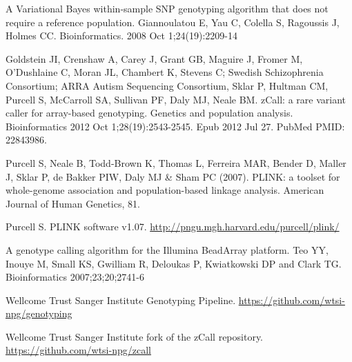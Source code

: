 \documentclass{article}
\begin{document}
\FloatBarrier

\begin{thebibliography}{9}

 A Variational Bayes within-sample SNP genotyping algorithm that does not require a reference population. Giannoulatou E, Yau C, Colella S, Ragoussis J, Holmes CC. Bioinformatics. 2008 Oct 1;24(19):2209-14

Goldstein JI, Crenshaw A, Carey J, Grant GB, Maguire J, Fromer M, O'Dushlaine C, Moran JL, Chambert K, Stevens C; Swedish Schizophrenia Consortium; ARRA Autism Sequencing Consortium, Sklar P, Hultman CM, Purcell S, McCarroll SA, Sullivan PF, Daly MJ, Neale BM. 
zCall: a rare variant caller for array-based genotyping.
Genetics and population analysis. Bioinformatics 2012 Oct 1;28(19):2543-2545. Epub 2012 Jul 27. PubMed PMID: 22843986.

Purcell S, Neale B, Todd-Brown K, Thomas L, Ferreira MAR, Bender D, Maller J, Sklar P, de Bakker PIW, Daly MJ \& Sham PC (2007).
PLINK: a toolset for whole-genome association and population-based linkage analysis. American Journal of Human Genetics, 81.

Purcell S. PLINK software v1.07. \url{http://pngu.mgh.harvard.edu/purcell/plink/}

 A genotype calling algorithm for the Illumina BeadArray platform. Teo YY, Inouye M, Small KS, Gwilliam R, Deloukas P, Kwiatkowski DP and Clark TG. Bioinformatics 2007;23;20;2741-6

Wellcome Trust Sanger Institute Genotyping Pipeline. \url{https://github.com/wtsi-npg/genotyping} 

Wellcome Trust Sanger Institute fork of the zCall repository. \url{https://github.com/wtsi-npg/zcall} 

\end{thebibliography}
\end{document}
